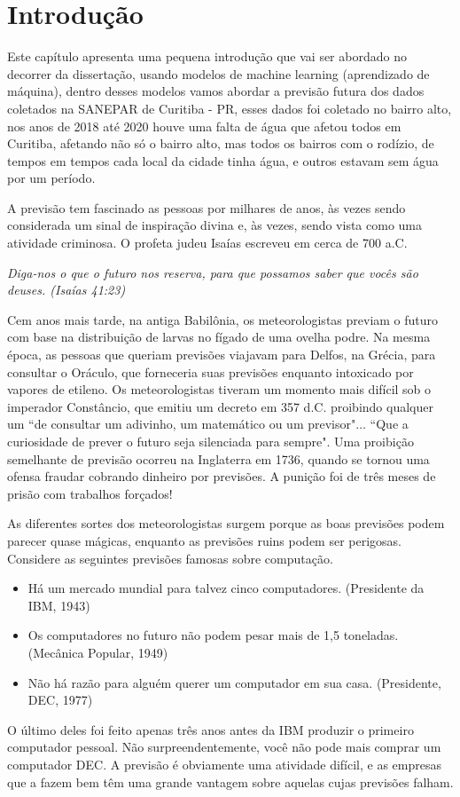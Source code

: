 

\section{Introdução} \label{sec:int}

Este capítulo apresenta uma pequena introdução que vai ser abordado no decorrer da dissertação, usando modelos de machine learning (aprendizado de máquina), dentro desses modelos vamos abordar a previsão futura dos dados coletados na SANEPAR de Curitiba - PR, esses dados foi coletado no bairro alto, nos anos de 2018 até 2020 houve uma falta de água que afetou todos em Curitiba, afetando não só o bairro alto, mas todos os bairros com o rodízio, de tempos em tempos cada local da cidade tinha água, e outros estavam sem água por um período.

 A previsão tem fascinado as pessoas por milhares de anos, às vezes sendo considerada um sinal de inspiração divina e, às vezes, sendo vista como uma atividade criminosa. O profeta judeu Isaías escreveu em cerca de 700 a.C.

\textit{Diga-nos o que o futuro nos reserva, para que possamos saber que vocês são deuses.
(Isaías 41:23)}

Cem anos mais tarde, na antiga Babilônia, os meteorologistas previam o futuro com base na distribuição de larvas no fígado de uma ovelha podre. Na mesma época, as pessoas que queriam previsões viajavam para Delfos, na Grécia, para consultar o Oráculo, que forneceria suas previsões enquanto intoxicado por vapores de etileno. Os meteorologistas tiveram um momento mais difícil sob o imperador Constâncio, que emitiu um decreto em 357 d.C. proibindo qualquer um ``de consultar um adivinho, um matemático ou um previsor"$\ldots$ 
``Que a curiosidade de prever o futuro seja silenciada para sempre". Uma proibição semelhante de previsão ocorreu na Inglaterra em 1736, quando se tornou uma ofensa fraudar cobrando dinheiro por previsões. A punição foi de três meses de prisão com trabalhos forçados!

As diferentes sortes dos meteorologistas surgem porque as boas previsões podem parecer quase mágicas, enquanto as previsões ruins podem ser perigosas. Considere as seguintes previsões famosas sobre computação.

\begin{itemize}
	\item Há um mercado mundial para talvez cinco computadores. (Presidente da IBM, 1943)
\item Os computadores no futuro não podem pesar mais de 1,5 toneladas. (Mecânica Popular, 1949)
\item Não há razão para alguém querer um computador em sua casa. (Presidente, DEC, 1977)
\end{itemize}
O último deles foi feito apenas três anos antes da IBM produzir o primeiro computador pessoal. Não surpreendentemente, você não pode mais comprar um computador DEC. A previsão é obviamente uma atividade difícil, e as empresas que a fazem bem têm uma grande vantagem sobre aquelas cujas previsões falham.




